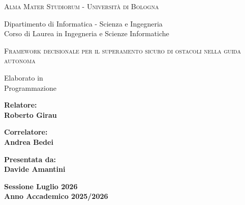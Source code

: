 \documentclass[a4paper,final,12pt,oneside]{report}
\begin{document}

\begin{titlepage}
  \begin{center}
    {\Large{\textsc{Alma Mater Studiorum - Università di Bologna}}}\\

    \vspace{5mm}

    {\small
    Dipartimento di Informatica - Scienza e Ingegneria\\
    Corso di Laurea in Ingegneria e Scienze Informatiche
    }
  \end{center}

  \vspace{18mm}

  \begin{center}
    {\Large\textsc{
    Framework decisionale per il superamento sicuro di ostacoli nella guida autonoma
    }}
  \end{center}

  \vspace{20mm}

  \begin{center}
    \large{Elaborato in\\
    Programmazione}
  \end{center}

  \vspace{30mm}

  \noindent
  \begin{minipage}[t]{0.47\textwidth}
    {\large{\bf Relatore:\\
    Roberto Girau\\[4mm]}}

    {\large{\bf Correlatore:\\
    Andrea Bedei}}
  \end{minipage}
  \hfill
  \begin{minipage}[t]{0.47\textwidth}
    \raggedleft
    {\large{\bf Presentata da:\\
    Davide Amantini}}
  \end{minipage}

  \vfill

  \begin{center}
    {\large{\bf Sessione Luglio 2026\\
    Anno Accademico 2025/2026}}
  \end{center}
\end{titlepage}
\end{document}
